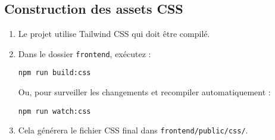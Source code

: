 \documentclass[12pt, a4paper]{article}
\begin{document}
\subsection{Construction des assets CSS}
\begin{stepbox}
\begin{enumerate}
  \item Le projet utilise Tailwind CSS qui doit être compilé.
  \item Dans le dossier \texttt{frontend}, exécutez :
  \begin{lstlisting}
npm run build:css
  \end{lstlisting}
  Ou, pour surveiller les changements et recompiler automatiquement :
  \begin{lstlisting}
npm run watch:css
  \end{lstlisting}
  \item Cela générera le fichier CSS final dans \texttt{frontend/public/css/}.
\end{enumerate}
\end{stepbox}
\end{document}

